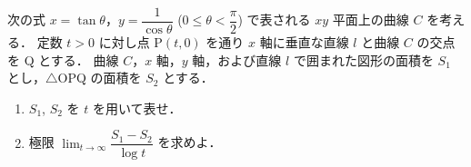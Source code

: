 \documentclass[../../main.tex]{subfiles}
\begin{document}
次の式 $x = \tan\theta$，$\displaystyle y = \dfrac{1}{\cos\theta}$ ($0 \le \theta < \dfrac{\pi}{2}$) で表される $xy$ 平面上の曲線 $C$ を考える．
定数 $t>0$ に対し点 P$(t,0)$ を通り $x$ 軸に垂直な直線 $l$ と曲線 $C$ の交点を Q とする．
曲線 $C$，$x$ 軸，$y$ 軸，および直線 $l$ で囲まれた図形の面積を $S_1$ とし，$\triangle$OPQ の面積を $S_2$ とする．
\begin{enumerate}
  \item $S_1$, $S_2$ を $t$ を用いて表せ．
  \item 極限 $\displaystyle\lim_{t \to \infty} \dfrac{S_1 - S_2}{\log t}$ を求めよ．
\end{enumerate}
\end{document}
